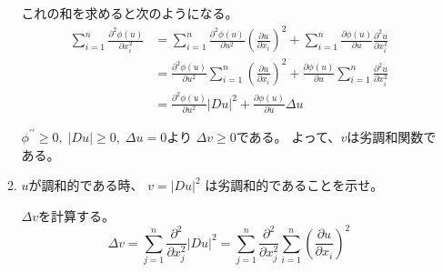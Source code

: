 \documentclass[12pt,b5paper]{ltjsarticle}
\begin{document}
\begin{enumerate}
\begin{enumerate}
            これの和を求めると次のようになる。
            \begin{align}
             \sum_{i=1}^{n} \frac{\partial^{2} \phi(u)}{\partial x_{i}^{2}}
              &= \sum_{i=1}^{n} \frac{\partial^{2} \phi(u)}{\partial u^{2}} \left( \frac{\partial u}{\partial x_{i}} \right)^{2}
               + \sum_{i=1}^{n} \frac{\partial \phi(u)}{\partial u} \frac{\partial^{2} u}{\partial x_{i}^{2}}\\
              &= \frac{\partial^{2} \phi(u)}{\partial u^{2}}  \sum_{i=1}^{n} \left( \frac{\partial u}{\partial x_{i}} \right)^{2}
               + \frac{\partial \phi(u)}{\partial u} \sum_{i=1}^{n} \frac{\partial^{2} u}{\partial x_{i}^{2}}\\
              &= \frac{\partial^{2} \phi(u)}{\partial u^{2}} \lvert Du \rvert^{2}
               + \frac{\partial \phi(u)}{\partial u} \Delta u
            \end{align}

            $\phi^{\prime\prime} \geq 0,\; \lvert Du \rvert \geq 0,\; \Delta u =0$より
            $\Delta v \geq 0$である。
            よって、$v$は劣調和関数である。


            \hrulefill

       \item

            $u$が調和的である時、
            $v = \lvert Du \rvert^{2}$
            は劣調和的であることを示せ。

            \dotfill

            $\Delta v$を計算する。
            \begin{equation}
             \Delta v
              = \sum_{j=1}^{n} \frac{\partial^{2}}{\partial x_{j}^{2}} \lvert Du \rvert^{2}
              = \sum_{j=1}^{n} \frac{\partial^{2}}{\partial x_{j}^{2}}
                \sum_{i=1}^{n} \left( \frac{\partial u}{\partial x_{i}} \right)^{2}
            \end{equation}


\end{enumerate}
\end{enumerate}
\end{document}
